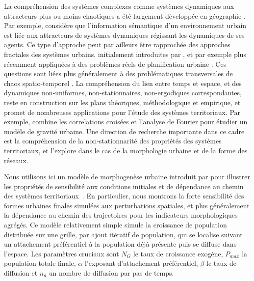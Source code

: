 \documentclass[11pt]{article}
\begin{document}
La compréhension des systèmes complexes comme systèmes dynamiques aux attracteurs plus ou moins chaotiques a été largement développée en géographie \citep{dauphine1995chaos}. Par exemple, \cite{e18060197} considère que l'information sémantique d'un environnement urbain est liée aux attracteurs de systèmes dynamiques régissant les dynamiques de ses agents. Ce type d'approche peut par ailleurs être rapprochée des approches fractales des systèmes urbains, initialement introduites par \cite{batty1994fractal}, et par exemple plus récemment appliquées à des problèmes réels de planification urbaine \citep{yamu2015spatial}. Ces questions sont liées plus généralement à des problématiques transversales de chaos spatio-temporel \citep{crutchfield1987phenomenology}. La compréhension du lien entre temps et espace, et des dynamiques non-uniformes, non-stationnaires, non-ergodiques correspondantes, reste en construction sur les plans théoriques, méthodologique et empirique, et promet de nombreuses applications pour l'étude des systèmes territoriaux. Par exemple,  \cite{chen2009urban} combine les correlations croisées et l'analyse de Fourier pour étudier un modèle de gravité urbaine. Une direction de recherche importante dans ce cadre est la compréhension de la non-stationnarité des propriétés des systèmes territoriaux, et \cite{raimbault2018urban} l'explore dans le cas de la morphologie urbaine et de la forme des réseaux.





Nous utilisons ici un modèle de morphogenèse urbaine introduit par \cite{raimbault2018calibration} pour illustrer les propriétés de sensibilité aux conditions initiales et de dépendance au chemin des systèmes territoriaux~\citep{pumain2012urban}. En particulier, nous montrons la forte sensibilité des formes urbaines finales simulées aux perturbations spatiales, et plus généralement la dépendance au chemin des trajectoires pour les indicateurs morphologiques agrégés. Ce modèle relativement simple simule la croissance de population distribuée sur une grille, par ajout itératif de population, qui se localise suivant un attachement préférentiel à la population déjà présente puis se diffuse dans l'espace. Les paramètres cruciaux sont $N_G$ le taux de croissance exogène, $P_{max}$ la population totale finale, $\alpha$ l'exposant d'attachement préférentiel, $\beta$ le taux de diffusion et $n_d$ un nombre de diffusion par pas de temps.
\end{document}
